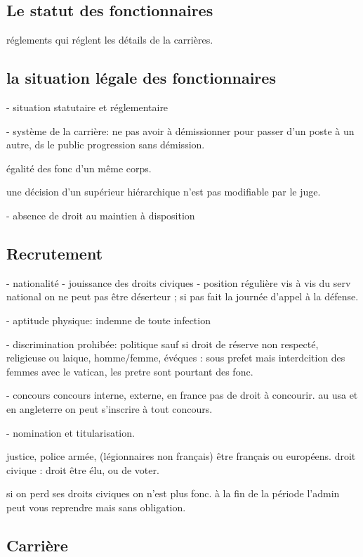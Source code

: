 \documentclass[a4paper,12pt]{article}
\begin{document}
\subsection{Le statut des fonctionnaires}
réglements qui réglent les détails de la carrières.
\subsection{la situation légale des fonctionnaires}

- situation statutaire et réglementaire

- système de la carrière:
ne pas avoir à démissionner pour passer d'un poste à un autre, ds le public progression sans démission.

égalité des fonc d'un même corps.

une décision d'un supérieur hiérarchique n'est pas modifiable par le juge.


- absence de droit au maintien à disposition


\subsection{Recrutement}

- nationalité
- jouissance des droits civiques
- position régulière vis à vis du serv national
on ne peut pas être déserteur ; si pas fait la journée d'appel à la défense.

- aptitude physique:
indemne de toute infection

- discrimination prohibée:
politique sauf si droit de réserve non respecté, religieuse ou laique, homme/femme,
évéques : sous prefet mais interdcition des femmes avec le vatican, les pretre sont pourtant des
fonc.


- concours
concours interne, externe, en france pas de droit à concourir.
au usa et en angleterre on peut s'inscrire à tout concours.

- nomination et titularisation.

justice, police armée, (légionnaires non français)
être français ou européens.
droit civique : droit être élu, ou de voter.

si on perd ses droits civiques on n'est plus fonc.
à la fin de la période l'admin peut vous reprendre mais sans obligation.

\subsection{Carrière}
\end{document}

